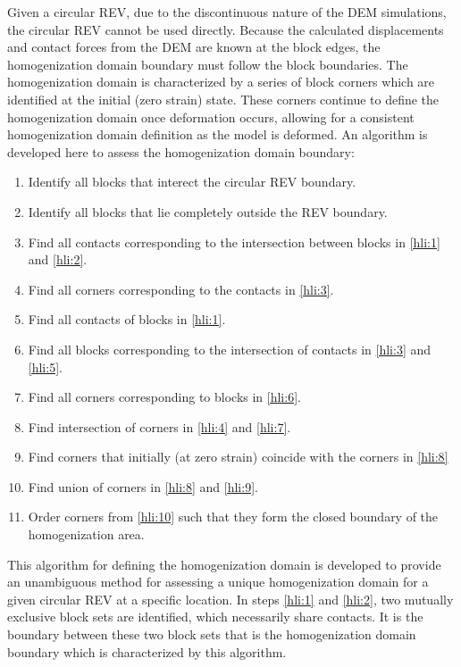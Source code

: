 Given a circular REV, due to the discontinuous nature of the DEM simulations, the circular REV cannot be used directly. Because the calculated displacements and contact forces from the DEM are known at the block edges, the homogenization domain boundary must follow the block boundaries. The homogenization domain is characterized by a series of block corners which are identified at the initial (zero strain) state. These corners continue to define the homogenization domain once deformation occurs, allowing for a consistent homogenization domain definition as the model is deformed. An algorithm is developed here to assess the homogenization domain boundary: 

\begin{enumerate}
\item \label{hli:1} Identify all blocks that interect the circular REV boundary. 
\item \label{hli:2} Identify all blocks that lie completely outside the REV boundary. 
\item \label{hli:3} Find all contacts corresponding to the intersection between blocks in \ref{hli:1} and \ref{hli:2}. 
\item \label{hli:4} Find all corners corresponding to the contacts in \ref{hli:3}. 
\item \label{hli:5} Find all contacts of blocks in \ref{hli:1}. 
\item \label{hli:6} Find all blocks corresponding to the intersection of contacts in \ref{hli:3} and \ref{hli:5}. 
\item \label{hli:7} Find all corners corresponding to blocks in \ref{hli:6}. 
\item \label{hli:8} Find intersection of corners in \ref{hli:4} and \ref{hli:7}. 
\item \label{hli:9} Find corners that initially (at zero strain) coincide with the corners in \ref{hli:8} 
\item \label{hli:10} Find union of corners in \ref{hli:8} and \ref{hli:9}. 
\item \label{hli:11} Order corners from \ref{hli:10} such that they form the closed boundary of the homogenization area.
\end{enumerate}

This algorithm for defining the homogenization domain is developed to provide an unambiguous method for assessing a unique homogenization domain for a given circular REV at a specific location. In steps \ref{hli:1} and \ref{hli:2}, two mutually exclusive block sets are identified, which necessarily share contacts. It is the boundary between these two block sets that is the homogenization domain boundary which is characterized by this algorithm. 

